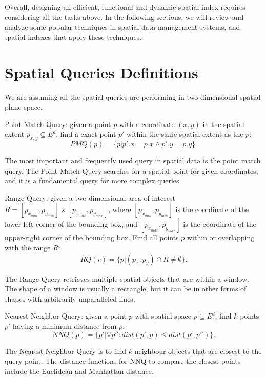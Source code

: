 Overall, designing an efficient, functional and dynamic spatial index requires considering all the tasks above. In the following sections, we will review and analyze some popular techniques in spatial data management systems, and spatial indexes that apply these techniques. 




\section{Spatial Queries Definitions}
We are assuming all the spatial queries are performing in two-dimensional spatial plane space. 

\begin{query}\label{def:pmq}
Point Match Query: given a point $p$ with a coordinate $(x, y)$ in the spatial extent ${p_{x, y}} \subseteq {E^d}$, find a exact point $p'$ within the same spatial extent as the $p$:
\[PMQ(p) = \{p|p'.x = p.x \land p'.y = p.y\}.\]
\end{query}

The most important and frequently used query in spatial data is the point match query. The Point Match Query searches for a spatial point for given coordinates, and it is a fundamental query for more complex queries.

\begin{query}\label{def:rq}
Range Query: given a two-dimensional area of interest $R = [p_{x_{min}}, p_{y_{min}}] \times [p_{x_{max}}, p_{y_{max}}]$, where $[p_{x_{min}}, p_{y_{min}}]$ is the coordinate of the lower-left corner of the bounding box, and $[p_{x_{max}}, p_{y_{max}}]$ is the coordinate of the upper-right corner of the bounding box. Find all points $p$ within or overlapping with the range $R$:
\[RQ(r) = \{p|(p_x, p_y) \cap R \neq \emptyset\}.\]
\end{query}

The Range Query retrieves multiple spatial objects that are within a window. The shape of a window is usually a rectangle, but it can be in other forms of shapes with arbitrarily unparalleled lines.

\begin{query}\label{def:nnq}
Nearest-Neighbor Query: given a point $p$ with spatial space $p\subseteq{E^d}$, find $k$ points $p'$ having a minimum distance from $p$:
\[NNQ(p) = \{p'|\forall p'':dist(p', p) \leq dist(p', p'')\}.\]
\end{query}

The Nearest-Neighbor Query is to find $k$ neighbour objects that are closest to the query point.  The distance functions for NNQ to compare the closest points include the Euclidean and Manhattan distance. 



